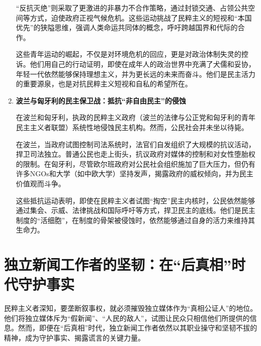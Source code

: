 \begin{enumerate}
    “反抗灭绝”则采取了更激进的非暴力不合作策略，通过封锁交通、占领公共空间等方式，迫使政府正视气候危机。这些运动挑战了民粹主义的短视和“本国优先”的狭隘思维，强调人类命运共同体的概念，呼吁跨越国界和代际的合作。

    这些青年运动的崛起，不仅是对环境危机的回应，更是对政治体制失灵的控诉。他们用自己的行动证明，即使在成年人的政治世界中充满了犬儒和妥协，年轻一代依然能够保持理想主义，并为更长远的未来而奋斗。他们是民主活力的重要源泉，也是对抗民粹主义短视和自私的希望所在。

    \item \textbf{波兰与匈牙利的民主保卫战：抵抗“非自由民主”的侵蚀}

    在波兰和匈牙利，执政的民粹主义政府（波兰的法律与公正党和匈牙利的青年民主主义者联盟）系统性地侵蚀民主机构。然而，公民社会并未坐以待毙。

    在波兰，当政府试图控制司法系统时，法官们自发组织了大规模的抗议活动，捍卫司法独立。普通公民也走上街头，抗议政府对媒体的控制和对女性堕胎权的限制。在匈牙利，尽管欧尔班政府对公民社会组织施加了巨大压力，但仍有许多NGOs和大学（如中欧大学）坚持发声，揭露政府的威权倾向，并为民主价值观而斗争。

    这些抵抗运动表明，即使在民粹主义者试图“掏空”民主内核时，公民依然能够通过集会、示威、法律挑战和国际呼吁等方式，捍卫民主的底线。他们是民主制度的“活细胞”，在制度的骨架被侵蚀时，依然能够通过自身的活力来维持其生命力。
\end{enumerate}

\section{独立新闻工作者的坚韧：在“后真相”时代守护事实}

民粹主义者深知，要垄断叙事权，就必须摧毁独立媒体作为“真相公证人”的地位。他们将独立媒体斥为“假新闻”、“人民的敌人”，试图让民众只相信他们所提供的信息。然而，即便在“后真相”时代，独立新闻工作者依然以其职业操守和坚韧不拔的精神，成为守护事实、揭露谎言的关键力量。

